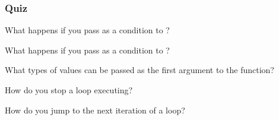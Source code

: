 \documentclass[12pt]{beamer}\usepackage[]{graphicx}\usepackage[]{color}
\begin{document}

\begin{frame}
\frametitle{Quiz}

\bbi
  \item What happens if you pass  as a condition to ?
  \item What happens if you pass  as a condition to ?
  \item What types of values can be passed as the first argument to the  function?
  \item How do you stop a  loop executing?
  \item How do you jump to the next iteration of a loop?
\ei

\end{frame}

\end{document}
